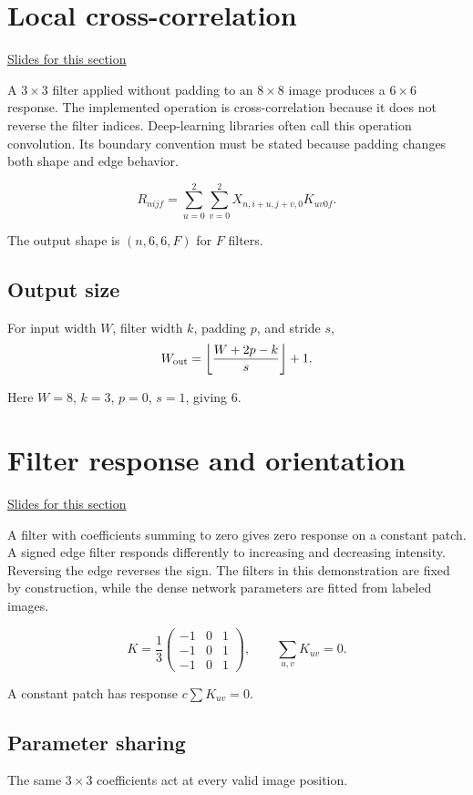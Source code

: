 \documentclass[11pt,letterpaper]{article}
\theoremstyle{definition}\newtheorem{definition}{Definition}\newtheorem{example}{Example}
\numberwithin{equation}{section}
\begin{document}
\section{Local cross-correlation}
\hypertarget{note-local-cross-correlation}{}\label{note:local-cross-correlation}
{\small \href{slides.html\#frame=filters-panel-1\&step=1}{Slides for this section}}\par
A $3\times3$ filter applied without padding to an $8\times8$ image produces a $6\times6$ response. The implemented operation is cross-correlation because it does not reverse the filter indices. Deep-learning libraries often call this operation convolution. Its boundary convention must be stated because padding changes both shape and edge behavior.

\[
R_{nijf}=\sum_{u=0}^{2}\sum_{v=0}^{2}X_{n,i+u,j+v,0}K_{uv0f}.
\]

The output shape is $(n,6,6,F)$ for $F$ filters.

\subsection*{Output size}
For input width $W$, filter width $k$, padding $p$, and stride $s$,
\[
W_{\rm out}=\left\lfloor\frac{W+2p-k}{s}\right\rfloor+1.
\]

Here $W=8$, $k=3$, $p=0$, $s=1$, giving $6$.
\section{Filter response and orientation}
\hypertarget{note-filter-response-and-orientation}{}\label{note:filter-response-and-orientation}
{\small \href{slides.html\#frame=filter-response-and-orientation\&step=1}{Slides for this section}}\par
A filter with coefficients summing to zero gives zero response on a constant patch. A signed edge filter responds differently to increasing and decreasing intensity. Reversing the edge reverses the sign. The filters in this demonstration are fixed by construction, while the dense network parameters are fitted from labeled images.

\[
K=\frac13\begin{pmatrix}-1&0&1\\-1&0&1\\-1&0&1\end{pmatrix},\qquad \sum_{u,v}K_{uv}=0.
\]

A constant patch has response $c\sum K_{uv}=0$.

\subsection*{Parameter sharing}
The same $3\times3$ coefficients act at every valid image position.
\end{document}
